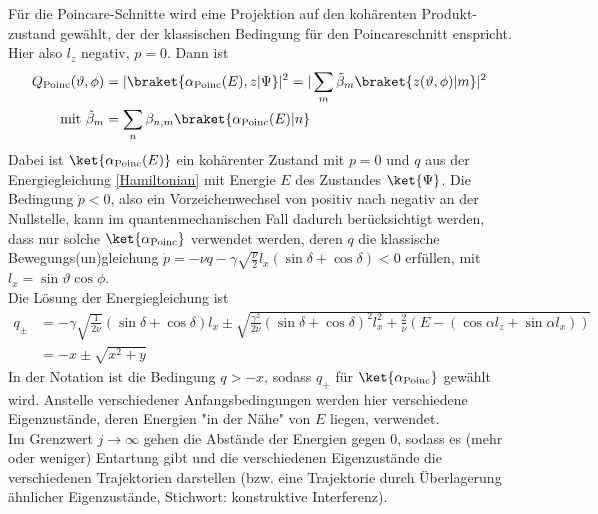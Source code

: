 Für die Poincare-Schnitte wird eine Projektion auf den kohärenten Produkt-zustand gewählt, der der klassischen Bedingung für den Poincareschnitt enspricht.
Hier also $l_z$ negativ, $p = 0$. 
Dann ist
\begin{align}
  Q_\text{Poinc} (\vartheta,\phi)&= |\braket{\alpha_\text{Poinc}(E),z|\Psi}|^2 = |\sum\limits_m \tilde\beta_{m} \braket{z(\vartheta,\phi)|m}|^2\\
  \text{mit  } \tilde\beta_m &= \sum\limits_n \beta_{n,m}\braket{\alpha_\text{Poinc}(E)|n}
\end{align}
Dabei ist $\ket{\alpha_\text{Poinc}(E)}$ ein kohärenter Zustand mit $p=0$ und $q$ aus der Energiegleichung \eqref{Hamiltonian} mit Energie $E$ des Zustandes $\ket{\Psi}$.
Die Bedingung $\dot p < 0$, also ein Vorzeichenwechsel von positiv nach negativ an der Nullstelle, kann im quantenmechanischen Fall dadurch berücksichtigt werden, dass nur solche $\ket{\alpha_\text{Poinc}}$ verwendet werden, deren $q$ die klassische Bewegungs(un)gleichung $\dot p=-\nu q - \gamma \sqrt{\frac{\nu}{2}} l_x (\sin\delta + \cos\delta) < 0$ erfüllen, mit $l_x= \sin\vartheta\cos\phi$.\\
Die Lösung der Energiegleichung ist 
\begin{align}
 q_\pm  &= -\gamma\sqrt{\frac{1}{2\nu}}(\sin\delta + \cos\delta)l_x \pm \sqrt{ \frac{\gamma^2}{2\nu}(\sin\delta +\cos\delta)^2 l_x^2 + \frac{2}{\nu}(E-(\cos\alpha l_z + \sin\alpha l_x)) }\\
 &= -x \pm \sqrt{x^2+y}
\end{align}
In der Notation ist die Bedingung $q > -x$, sodass $q_+$ für $\ket{\alpha_\text{Poinc}}$ gewählt wird.
Anstelle verschiedener Anfangsbedingungen werden hier verschiedene Eigenzustände, deren Energien "in der Nähe" von $E$ liegen, verwendet.\\
Im Grenzwert $j\rightarrow \infty$ gehen die Abstände der Energien gegen 0, sodass es (mehr oder weniger) Entartung gibt und die verschiedenen Eigenzustände die verschiedenen Trajektorien darstellen (bzw. eine Trajektorie durch Überlagerung ähnlicher Eigenzustände, Stichwort: konstruktive Interferenz).


